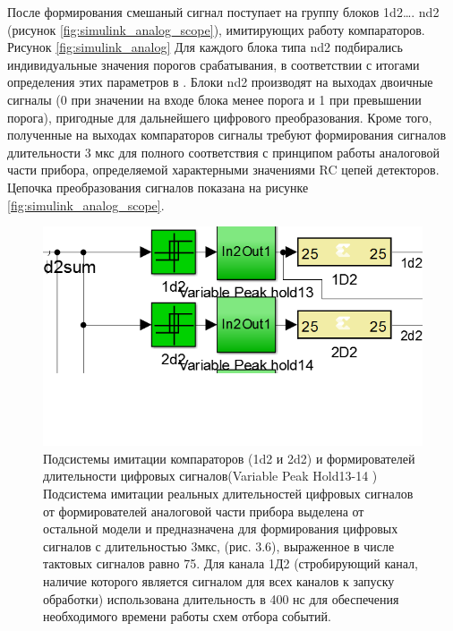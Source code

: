 После формирования смешаный сигнал поступает на группу блоков 1d2…. nd2 (рисунок \ref{fig:simulink_analog_scope}), имитирующих работу компараторов. 
Рисунок \ref{fig:simulink_analog} Для каждого блока типа  nd2 подбирались индивидуальные значения порогов срабатывания, в соответствии с итогами определения этих параметров в . Блоки nd2 производят на выходах двоичные сигналы (0 при значении на входе блока менее порога и 1 при превышении порога), пригодные для дальнейшего цифрового преобразования. Кроме того, полученные на выходах компараторов сигналы требуют формирования сигналов длительности 3 мкс для полного соответствия с принципом работы аналоговой части прибора, определяемой характерными значениями RC цепей детекторов. Цепочка преобразования сигналов показана на рисунке \ref{fig:simulink_analog_scope}.

\begin{figure}
\centering
\includegraphics[width=0.7\linewidth]{images/sim_comparators}
\caption{Подсистемы имитации компараторов (1d2 и 2d2) и формирователей длительности цифровых сигналов(Variable Peak Hold13-14 )
	Подсистема имитации реальных длительностей цифровых сигналов от формирователей аналоговой части прибора выделена от остальной модели и предназначена для формирования цифровых сигналов с длительностью 3мкс, (рис. 3.6), выраженное в числе тактовых сигналов равно 75. Для канала 1Д2 (стробирующий канал, наличие которого является сигналом для всех каналов к запуску обработки) использована длительность в 400 нс для обеспечения необходимого времени работы схем отбора событий.}
\label{fig:sim_comparators}
\end{figure}


